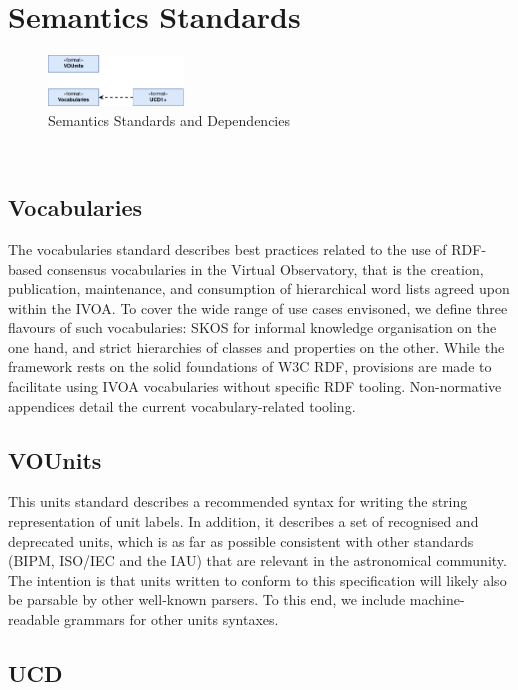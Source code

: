 \documentclass[11pt,a4paper]{ivoa}
\begin{document}
\section{Semantics Standards}

\begin{figure}[h]
\centering
\includegraphics[width=0.32\textwidth]{ivoa-arch-semantics.png}
\caption{Semantics Standards and Dependencies}
\label{fig:semdeps}
\end{figure}
\
\subsection{Vocabularies}

The vocabularies standard describes best practices related to the use of RDF-based consensus 
vocabularies in the Virtual Observatory, that is the creation, publication, maintenance, and 
consumption of hierarchical word lists agreed upon within the IVOA. To cover the wide range 
of use cases envisoned, we define three flavours of such vocabularies: SKOS for informal 
knowledge organisation on the one hand, and strict hierarchies of classes and properties on 
the other. While the framework rests on the solid foundations of W3C RDF, provisions are made 
to facilitate using IVOA vocabularies without specific RDF tooling. Non-normative appendices 
detail the current vocabulary-related tooling.

\subsection{VOUnits}

This units standard describes a recommended syntax for writing the string representation of 
unit labels. In addition, it describes a set of recognised and deprecated units, which is as 
far as possible consistent with other standards (BIPM, ISO/IEC and the IAU) that are relevant 
in the astronomical community. The intention is that units written to conform to this 
specification will likely also be parsable by other well-known parsers. To this end, 
we include machine-readable grammars for other units syntaxes. 

\subsection{UCD}
\end{document}
